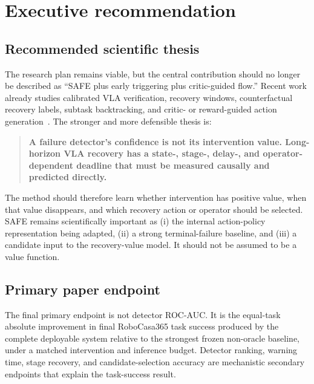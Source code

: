 \section{Executive recommendation}

\subsection{Recommended scientific thesis}

The research plan remains viable, but the central contribution should no longer be described as ``SAFE plus early triggering plus critic-guided flow.'' Recent work already studies calibrated VLA verification, recovery windows, counterfactual recovery labels, subtask backtracking, and critic- or reward-guided action generation~\cite{checkvla,b2ff,cyclevla,afil,rover,qvgm,guidedactionflow}. The stronger and more defensible thesis is:

\begin{quote}
\textbf{A failure detector's confidence is not its intervention value. Long-horizon VLA recovery has a state-, stage-, delay-, and operator-dependent deadline that must be measured causally and predicted directly.}
\end{quote}

The method should therefore learn whether intervention has positive value, when that value disappears, and which recovery action or operator should be selected. SAFE remains scientifically important as (i) the internal action-policy representation being adapted, (ii) a strong terminal-failure baseline, and (iii) a candidate input to the recovery-value model. It should not be assumed to be a value function.

\subsection{Primary paper endpoint}

The final primary endpoint is not detector ROC-AUC. It is the equal-task absolute improvement in final RoboCasa365 task success produced by the complete deployable system relative to the strongest frozen non-oracle baseline, under a matched intervention and inference budget. Detector ranking, warning time, stage recovery, and candidate-selection accuracy are mechanistic secondary endpoints that explain the task-success result.


